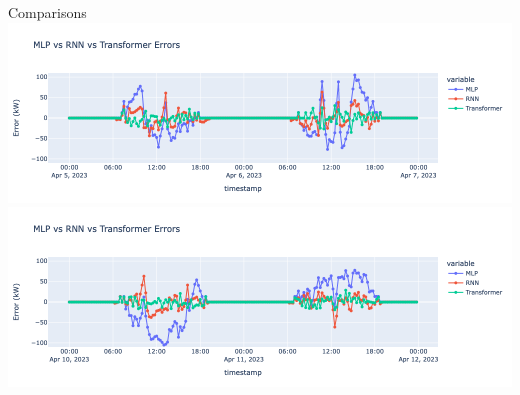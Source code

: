 \begin{frame}{Comparisons}
	\centering
	\includegraphics[width=\textwidth]{sections/5_eval/imgs/cmps/cmp3.png}
	\includegraphics[width=\textwidth]{sections/5_eval/imgs/cmps/cmp4.png}
\end{frame}

%    
%    
%         

